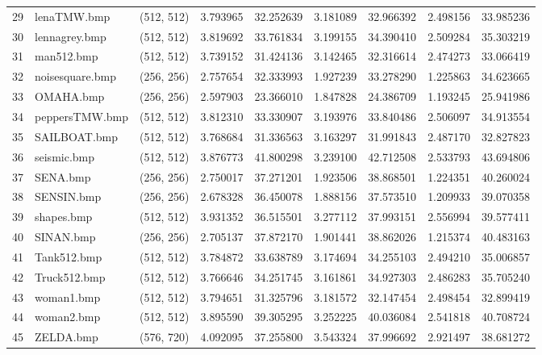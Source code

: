 \documentclass{article}
\begin{document}
\begin{table}[H]
\begin{adjustbox}{center}
\begin{tabular}{lllrrrrrr}
    29 &        lenaTMW.bmp &  (512, 512) &  3.793965 &  32.252639 &  3.181089 &  32.966392 &  2.498156 &  33.985236 \\
    30 &      lennagrey.bmp &  (512, 512) &  3.819692 &  33.761834 &  3.199155 &  34.390410 &  2.509284 &  35.303219 \\
    31 &         man512.bmp &  (512, 512) &  3.739152 &  31.424136 &  3.142465 &  32.316614 &  2.474273 &  33.066419 \\
    32 &    noisesquare.bmp &  (256, 256) &  2.757654 &  32.333993 &  1.927239 &  33.278290 &  1.225863 &  34.623665 \\
    33 &          OMAHA.bmp &  (256, 256) &  2.597903 &  23.366010 &  1.847828 &  24.386709 &  1.193245 &  25.941986 \\
    34 &     peppersTMW.bmp &  (512, 512) &  3.812310 &  33.330907 &  3.193976 &  33.840486 &  2.506097 &  34.913554 \\
    35 &       SAILBOAT.bmp &  (512, 512) &  3.768684 &  31.336563 &  3.163297 &  31.991843 &  2.487170 &  32.827823 \\
    36 &        seismic.bmp &  (512, 512) &  3.876773 &  41.800298 &  3.239100 &  42.712508 &  2.533793 &  43.694806 \\
    37 &           SENA.bmp &  (256, 256) &  2.750017 &  37.271201 &  1.923506 &  38.868501 &  1.224351 &  40.260024 \\
    38 &         SENSIN.bmp &  (256, 256) &  2.678328 &  36.450078 &  1.888156 &  37.573510 &  1.209933 &  39.070358 \\
    39 &         shapes.bmp &  (512, 512) &  3.931352 &  36.515501 &  3.277112 &  37.993151 &  2.556994 &  39.577411 \\
    40 &          SINAN.bmp &  (256, 256) &  2.705137 &  37.872170 &  1.901441 &  38.862026 &  1.215374 &  40.483163 \\
    41 &        Tank512.bmp &  (512, 512) &  3.784872 &  33.638789 &  3.174694 &  34.255103 &  2.494210 &  35.006857 \\
    42 &       Truck512.bmp &  (512, 512) &  3.766646 &  34.251745 &  3.161861 &  34.927303 &  2.486283 &  35.705240 \\
    43 &         woman1.bmp &  (512, 512) &  3.794651 &  31.325796 &  3.181572 &  32.147454 &  2.498454 &  32.899419 \\
    44 &         woman2.bmp &  (512, 512) &  3.895590 &  39.305295 &  3.252225 &  40.036084 &  2.541818 &  40.708724 \\
    45 &          ZELDA.bmp &  (576, 720) &  4.092095 &  37.255800 &  3.543324 &  37.996692 &  2.921497 &  38.681272 \\
    \bottomrule
    \end{tabular}
\end{adjustbox}
\end{table}
\end{document}
